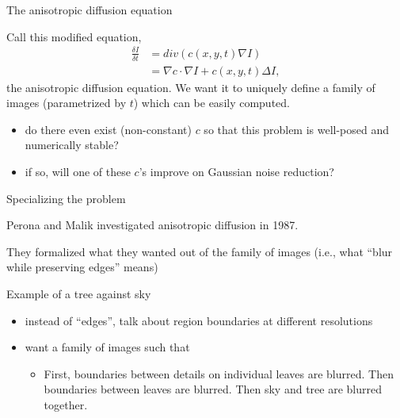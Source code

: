 \documentclass{beamer}
\begin{document}
\begin{frame}{The anisotropic diffusion equation}
    
    Call this modified equation,
    \begin{align*}
        \frac{\delta I}{\delta t} &= div\left(c(x,y,t)\nabla I\right)\\
        &=\nabla c\cdot \nabla I+c(x,y,t)\Delta I,
    \end{align*}
    the anisotropic diffusion equation. We want it to uniquely define a family of images (parametrized by $t$) which can be easily computed.
    
    \begin{itemize}
        \item do there even exist (non-constant) $c$ so that this problem is well-posed and numerically stable?
        \item if so, will one of these $c$'s improve on Gaussian noise reduction?
    \end{itemize}
    
\end{frame}

\begin{frame}{Specializing the problem}
    
    \begin{block}{}Perona and Malik investigated anisotropic diffusion in 1987.\end{block}
    
    \begin{block}{}They formalized what they wanted out of the family of images (i.e., what ``blur while preserving edges'' means)\end{block}
    
    \begin{block}{Example of a tree against sky}
        \begin{itemize}
            \item instead of ``edges'', talk about region boundaries at different resolutions
            \item want a family of images such that 
                \begin{itemize}
                    \item First, boundaries between details on individual leaves are blurred. Then boundaries between leaves are blurred. Then sky and tree are blurred together.
                \end{itemize}
        \end{itemize}
    \end{block}
    
\end{frame}
\end{document}

